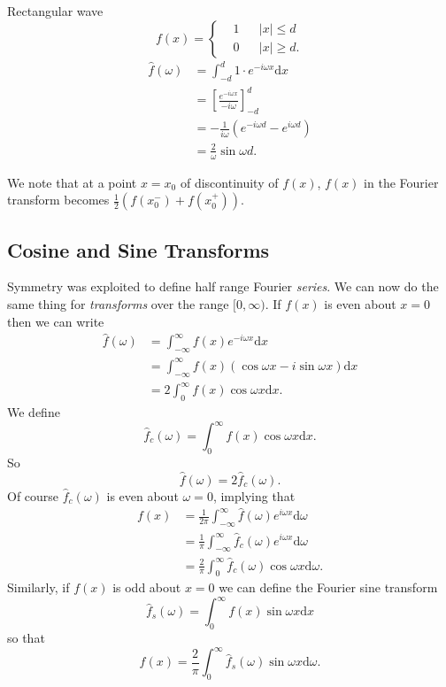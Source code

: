 \documentclass[12pt]{report}
\theoremstyle{definition}
\begin{document}
\begin{ex}
    Rectangular wave\[
        f(x) = \left\{\begin{align*}
            & 1 && |x|\le d \\
            & 0 && |x|\ge d.
        \end{align*}
    \]\[
        \begin{align*}
            \hat{f}(\omega) & = \int_{-d}^{d} 1\cdot e^{-i\omega x}\mathrm{d}x \\
                            & = {\left[\frac{e^{-i\omega x}}{-i\omega}\right]}^{d}_{-d} \\
                            & = -\frac{1}{i\omega}(e^{-i\omega d}-e^{i\omega d}) \\
                            & = \frac{2}{\omega}\sin{\omega d}.
        \end{align*}
    \]
\end{ex}

We note that at a point $x=x_0$ of discontinuity of $f(x)$,
$f(x)$ in the Fourier transform becomes $\frac{1}{2}(f(x_0^{-}) + f(x_0^{+}))$.

\subsection{Cosine and Sine Transforms}

Symmetry was exploited to define half range Fourier \emph{series}.
We can now do the same thing for \emph{transforms} over the range $[0,\infty)$.%
If $f(x)$ is even about $x=0$ then we can write\[
    \begin{align*}
        \hat{f}(\omega) & = \int_{-\infty}^{\infty} f(x)e^{-i\omega x}\mathrm{d}x \\
                        & = \int_{-\infty}^{\infty} f(x) (\cos{\omega x} - i\sin{\omega x}) \mathrm{d}x \\
                        & = 2 \int_{0}^{\infty} f(x)\cos{\omega x}\mathrm{d}x.
    \end{align*}
\]We define\[
\hat{f}_c(\omega) = \int_{0}^{\infty} f(x)\cos{\omega x}\mathrm{d}x.
\]So\[
\hat{f}(\omega) = 2\hat{f}_c(\omega).
\]
Of course $\hat{f}_c(\omega)$ is even about $\omega = 0$,
implying that\[
    \begin{align*}
        f(x) & = \frac{1}{2\pi}\int_{-\infty}^{\infty} \hat{f}(\omega)e^{i\omega x}\mathrm{d}\omega \\
             & = \frac{1}{\pi}\int_{-\infty}^{\infty} \hat{f}_c(\omega)e^{i\omega x}\mathrm{d}\omega \\
             & = \frac{2}{\pi}\int_{0}^{\infty} \hat{f}_c(\omega)\cos{\omega x}\mathrm{d}\omega.
    \end{align*}
\]
Similarly, if $f(x)$ is odd about $x=0$ we can define the Fourier sine transform\[
    \hat{f}_s(\omega) = \int_{0}^{\infty} f(x)\sin{\omega x}\mathrm{d}x
\]so that\[
f(x) = \frac{2}{\pi}\int_{0}^{\infty} \hat{f}_s(\omega)\sin{\omega x}\mathrm{d}\omega.
\]
\end{document}
